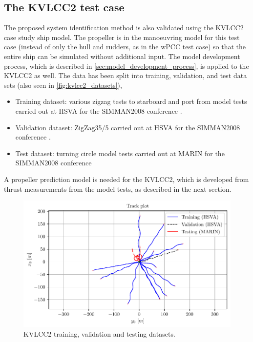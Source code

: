 \subsection{The KVLCC2 test case}
\label{\detokenize{05.01_case_studies:the-kvlcc2-test-scenarios}}
The proposed system identification method is also validated using the KVLCC2 case study ship model.
The propeller is in the manoeuvring model for this test case (instead of only the hull and rudders, as in the wPCC test case) so that the entire ship can be simulated without additional input.
The model development process, which is described in \autoref{sec:model_development_process}, is applied to the KVLCC2 as well.
The data has been split into training, validation, and test data sets (also seen in \autoref{fig:kvlcc2_datasets}),
\begin{itemize}
    \item Training dataset: various zigzag tests to starboard and port from model tests carried out at HSVA for the SIMMAN2008 conference \cite{stern_experience_2011}.
    \item Validation dataset: ZigZag35/5 carried out at HSVA for the SIMMAN2008 conference \cite{stern_experience_2011}.
    \item Test dataset: turning circle model tests carried out at MARIN for the SIMMAN2008 conference \cite{stern_experience_2011}
\end{itemize}
\noindent A propeller prediction model is needed for the KVLCC2, which is developed from thrust measurements from the model tests, as described in the next section.
\begin{figure}[h!]
\centering
\includegraphics[width=1.0\textwidth]{kappa/images/4.pdf}
\caption{KVLCC2 training, validation and testing datasets.}\label{fig:kvlcc2_datasets}\end{figure}
